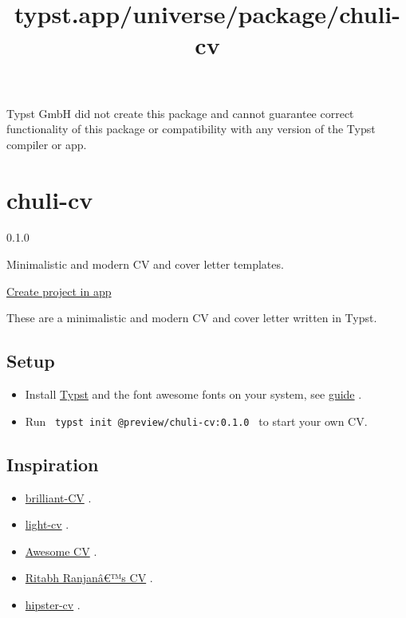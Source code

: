 Typst GmbH did not create this package and cannot guarantee correct
functionality of this package or compatibility with any version of the
Typst compiler or app.


\title{typst.app/universe/package/chuli-cv}

\label{banner}
\label{template-thumbnail}

\section{chuli-cv}\label{chuli-cv}

{ 0.1.0 }

Minimalistic and modern CV and cover letter templates.

\href{/app?template=chuli-cv&version=0.1.0}{Create project in app}

\label{readme}
These are a minimalistic and modern CV and cover letter written in
Typst.


\subsection{Setup}\label{setup}

\begin{itemize}
\tightlist
\item
  Install \href{https://typst.app/}{Typst} and the font awesome fonts on
  your system, see
  \href{https://github.com/duskmoon314/typst-fontawesome}{guide} .
\item
  Run \texttt{\ typst\ init\ @preview/chuli-cv:0.1.0\ } to start your
  own CV.
\end{itemize}

\subsection{Inspiration}\label{inspiration}

\begin{itemize}
\tightlist
\item
  \href{https://github.com/mintyfrankie/brilliant-CV}{brilliant-CV} .
\item
  \href{https://github.com/AnsgarLichter/light-cv}{light-cv} .
\item
  \href{https://github.com/posquit0/Awesome-CV}{Awesome CV} .
\item
  \href{https://www.overleaf.com/articles/ritabh-ranjans-cv/ngtndgryfykt}{Ritabh
  Ranjanâ€™s CV} .
\item
  \href{https://github.com/latex-ninja/hipster-cv}{hipster-cv} .
\end{itemize}

